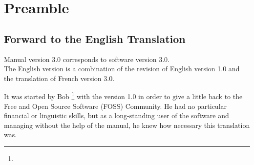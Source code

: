 \chapter{Preamble\label{preamble}}


\section{Forward to the English Translation\label{preamble-foreword}}

Manual version 3.0 corresponds to software version 3.0.\\
The English version is a combination of the revision of English version 1.0 and the translation of French version 3.0.

It was started by Bob \footnote{\urlBobAndersonEmail{}} with the version 1.0 in order to give a little back to the \gls{Free and Open Source Software} (FOSS) Community.  He had no particular financial or linguistic skills, but as a long-standing user of the software and managing without the help of the manual, he knew how necessary this translation was.

